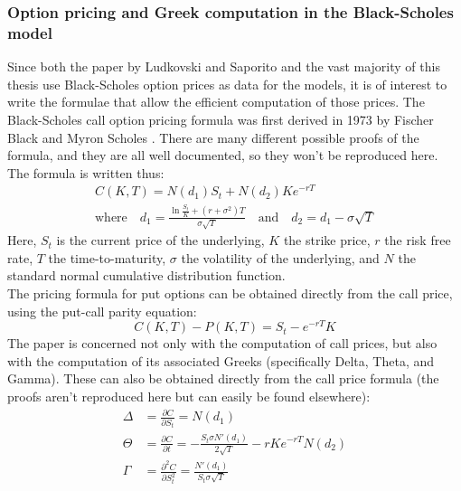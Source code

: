 \documentclass[a4paper,12pt]{article}
\begin{document}
\subsubsection{Option pricing and Greek computation in the Black-Scholes model}
Since both the paper by Ludkovski and Saporito and the vast majority of this thesis use Black-Scholes option prices as data for the models, it is of interest to write the formulae that allow the efficient computation of those prices. The Black-Scholes call option pricing formula was first derived in 1973 by Fischer Black and Myron Scholes \cite{Black1973}. There are many different possible proofs of the formula, and they are all well documented, so they won't be reproduced here. The formula is written thus:
\begin{equation}
\begin{gathered}
    C(K,T) = N(d_1) S_t + N(d_2) K e^{-r T} \\
    \text{where} \quad d_1 = \frac{\ln{\frac{S_t}{K}} + (r + \sigma^2)T}{\sigma \sqrt{T}} \quad \text{and} \quad d_2 = d_1 - \sigma \sqrt{T}
\end{gathered}
\end{equation}
Here, $S_t$ is the current price of the underlying, $K$ the strike price, $r$ the risk free rate, $T$ the time-to-maturity, $\sigma$ the volatility of the underlying, and $N$ the standard normal cumulative distribution function.\\
The pricing formula for put options can be obtained directly from the call price, using the put-call parity equation:
\begin{equation}
    C(K, T) - P(K, T) = S_t - e^{-r T}K
\end{equation}
The paper is concerned not only with the computation of call prices, but also with the computation of its associated Greeks (specifically Delta, Theta, and Gamma). These can also be obtained directly from the call price formula (the proofs aren't reproduced here but can easily be found elsewhere):
\begin{equation}
\begin{aligned}
    \Delta &= \frac{\partial C}{\partial S_t} = N(d_1)\\
    \Theta &= \frac{\partial C}{\partial t} = -\frac{S_t \sigma N'(d_1)}{2 \sqrt{T}} - r K e^{-r T} N(d_2)\\
    \Gamma &= \frac{\partial^2 C}{\partial S_t^2} = \frac{N'(d_1)}{S_t \sigma \sqrt{T}}
\end{aligned}
\end{equation}
\end{document}

